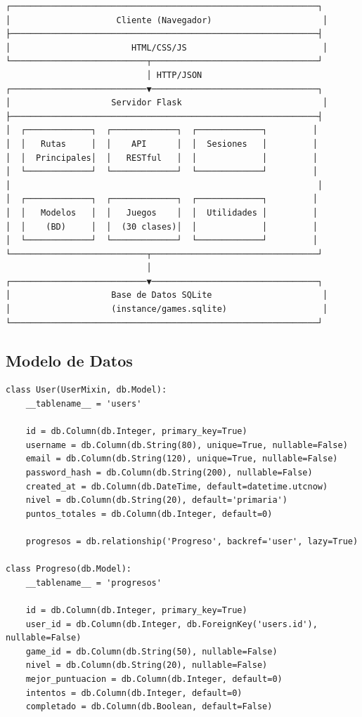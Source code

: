 \documentclass[12pt,a4paper]{article}
\begin{document}
\begin{verbatim}
┌─────────────────────────────────────────────────────────────┐
│                     Cliente (Navegador)                      │
├─────────────────────────────────────────────────────────────┤
│                        HTML/CSS/JS                           │
└───────────────────────────┬─────────────────────────────────┘
                            │ HTTP/JSON
┌───────────────────────────▼─────────────────────────────────┐
│                    Servidor Flask                            │
├─────────────────────────────────────────────────────────────┤
│  ┌─────────────┐  ┌─────────────┐  ┌─────────────┐         │
│  │   Rutas     │  │    API      │  │  Sesiones   │         │
│  │  Principales│  │   RESTful   │  │             │         │
│  └─────────────┘  └─────────────┘  └─────────────┘         │
│                                                             │
│  ┌─────────────┐  ┌─────────────┐  ┌─────────────┐         │
│  │   Modelos   │  │   Juegos    │  │  Utilidades │         │
│  │    (BD)     │  │  (30 clases)│  │             │         │
│  └─────────────┘  └─────────────┘  └─────────────┘         │
└───────────────────────────┬─────────────────────────────────┘
                            │
┌───────────────────────────▼─────────────────────────────────┐
│                    Base de Datos SQLite                      │
│                    (instance/games.sqlite)                   │
└─────────────────────────────────────────────────────────────┘
\end{verbatim}

\subsection{Modelo de Datos}

\begin{lstlisting}[caption=Modelos principales de la base de datos]
class User(UserMixin, db.Model):
    __tablename__ = 'users'
    
    id = db.Column(db.Integer, primary_key=True)
    username = db.Column(db.String(80), unique=True, nullable=False)
    email = db.Column(db.String(120), unique=True, nullable=False)
    password_hash = db.Column(db.String(200), nullable=False)
    created_at = db.Column(db.DateTime, default=datetime.utcnow)
    nivel = db.Column(db.String(20), default='primaria')
    puntos_totales = db.Column(db.Integer, default=0)
    
    progresos = db.relationship('Progreso', backref='user', lazy=True)

class Progreso(db.Model):
    __tablename__ = 'progresos'
    
    id = db.Column(db.Integer, primary_key=True)
    user_id = db.Column(db.Integer, db.ForeignKey('users.id'), nullable=False)
    game_id = db.Column(db.String(50), nullable=False)
    nivel = db.Column(db.String(20), nullable=False)
    mejor_puntuacion = db.Column(db.Integer, default=0)
    intentos = db.Column(db.Integer, default=0)
    completado = db.Column(db.Boolean, default=False)
\end{lstlisting}
\end{document}
